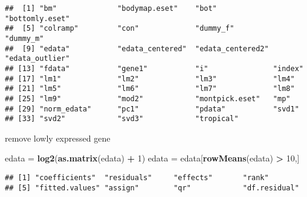 \documentclass[]{article}
\newenvironment{Shaded}{\begin{snugshade}}{\end{snugshade}}
\newcommand{\KeywordTok}[1]{\textcolor[rgb]{0.13,0.29,0.53}{\textbf{#1}}}
\newcommand{\DecValTok}[1]{\textcolor[rgb]{0.00,0.00,0.81}{#1}}
\newcommand{\StringTok}[1]{\textcolor[rgb]{0.31,0.60,0.02}{#1}}
\newcommand{\OperatorTok}[1]{\textcolor[rgb]{0.81,0.36,0.00}{\textbf{#1}}}
\newcommand{\NormalTok}[1]{#1}
\begin{document}
\begin{verbatim}
##  [1] "bm"              "bodymap.eset"    "bot"             "bottomly.eset"  
##  [5] "colramp"         "con"             "dummy_f"         "dummy_m"        
##  [9] "edata"           "edata_centered"  "edata_centered2" "edata_outlier"  
## [13] "fdata"           "gene1"           "i"               "index"          
## [17] "lm1"             "lm2"             "lm3"             "lm4"            
## [21] "lm5"             "lm6"             "lm7"             "lm8"            
## [25] "lm9"             "mod2"            "montpick.eset"   "mp"             
## [29] "norm_edata"      "pc1"             "pdata"           "svd1"           
## [33] "svd2"            "svd3"            "tropical"
\end{verbatim}

remove lowly expressed gene

\begin{Shaded}
\begin{Highlighting}[]
\NormalTok{edata =}\StringTok{ }\KeywordTok{log2}\NormalTok{(}\KeywordTok{as.matrix}\NormalTok{(edata) }\OperatorTok{+}\StringTok{ }\DecValTok{1}\NormalTok{)}
\NormalTok{edata =}\StringTok{ }\NormalTok{edata[}\KeywordTok{rowMeans}\NormalTok{(edata) }\OperatorTok{>}\StringTok{ }\DecValTok{10}\NormalTok{,]}
\end{Highlighting}
\end{Shaded}

\begin{Shaded}
\end{Shaded}

\begin{verbatim}
## [1] "coefficients"  "residuals"     "effects"       "rank"         
## [5] "fitted.values" "assign"        "qr"            "df.residual"
\end{verbatim}

\begin{Shaded}
\end{Shaded}
\end{document}
